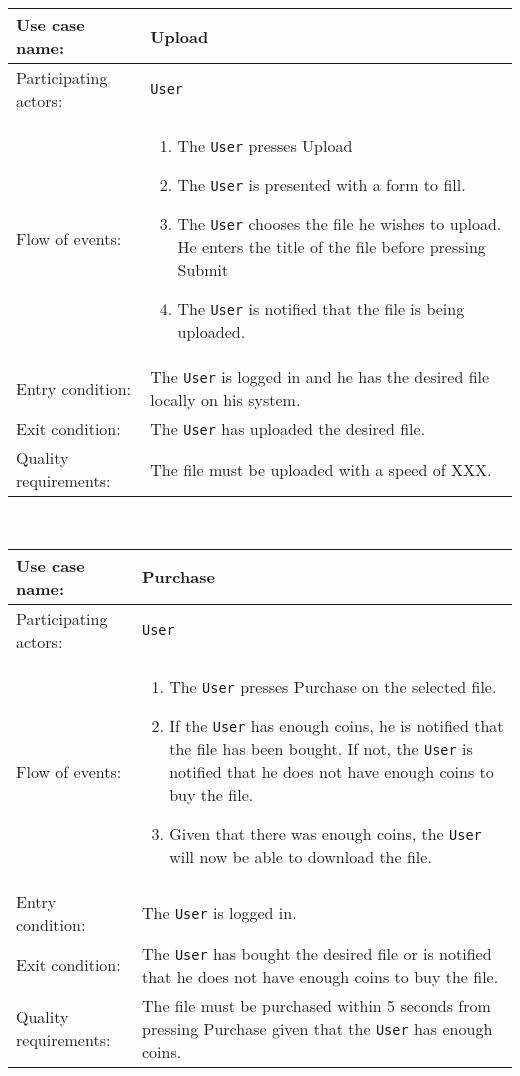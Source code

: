 \documentclass{article}
\begin{document}
\noindent
\begin{tabular}{| l | p{8cm} |}
  \hline                        
 Use case name:  & Upload   \\   \hline                
 Participating actors:  & \texttt{User} \\   \hline          
  Flow of events: & \begin{enumerate}
\item{The \texttt{User} presses Upload}
\item{The \texttt{User} is presented with a form to fill.}
\item{The \texttt{User} chooses the file he wishes to upload. He enters the title of the file before pressing Submit}
\item{The \texttt{User} is notified that the file is being uploaded.}
\end{enumerate}
 \\   \hline 
Entry condition: & The \texttt{User} is logged in and he has the desired file locally on his system. \\ \hline
Exit condition: & The \texttt{User} has uploaded the desired file. \\ \hline
Quality requirements: & The file must be uploaded with a speed of XXX. \\ \hline             
\end{tabular} \\

\noindent
\begin{tabular}{| l | p{8cm} |}
  \hline                        
 Use case name:  & Purchase   \\   \hline                
 Participating actors:  & \texttt{User} \\   \hline          
  Flow of events: & \begin{enumerate}
\item{The \texttt{User} presses Purchase on the selected file.}
\item{If the \texttt{User} has enough coins, he is notified that the file has been bought. If not, the \texttt{User} is notified that he does not have enough coins to buy the file.}
\item{Given that there was enough coins, the \texttt{User} will now be able to download the file.}
\end{enumerate}
 \\   \hline 
Entry condition: & The \texttt{User} is logged in. \\ \hline
Exit condition: & The \texttt{User} has bought the desired file or is notified that he does not have enough coins to buy the file. \\ \hline
Quality requirements: & The file must be purchased within 5 seconds from pressing Purchase given that the \texttt{User} has enough coins. \\ \hline             
\end{tabular} \\
\end{document}
